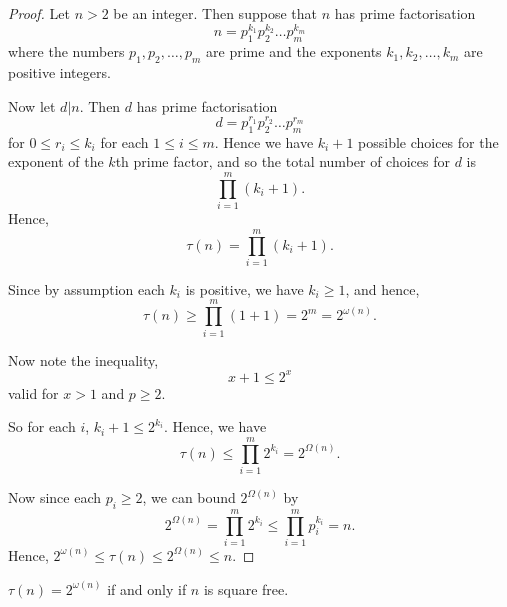 \documentclass{unswmaths}
\begin{document}
\begin{proof}
    Let $n > 2$ be an integer. Then suppose that $n$ has prime factorisation
    \begin{equation*}
        n = p_1^{k_1}p_2^{k_2}\ldots p_m^{k_m}
    \end{equation*}
    where the numbers $p_1,p_2,\ldots,p_m$ are prime and the exponents $k_1,k_2,\ldots,k_m$
    are positive integers.
    
    Now let $d|n$. Then $d$ has prime factorisation
    \begin{equation*}
        d = p_1^{r_1}p_2^{r_2}\ldots p_m^{r_m}
    \end{equation*}
    for $0\leq r_i \leq k_i$ for each $1\leq i \leq m$. Hence we have $k_i+1$
    possible choices for the exponent of the $k$th prime factor, and so the total
    number of choices for $d$ is
    \begin{equation*}
        \prod_{i=1}^m (k_i+1).
    \end{equation*}
    Hence,
    \begin{equation*}
        \tau(n) = \prod_{i=1}^m (k_i+1).
    \end{equation*}
    
    Since by assumption each $k_i$ is positive, we have $k_i \geq 1$, and hence,
    \begin{equation*}
        \tau(n) \geq \prod_{i=1}^m (1+1) = 2^m = 2^{\omega(n)}.
    \end{equation*}
    
    Now note the inequality,
    \begin{equation*}
        x+1\leq 2^x
    \end{equation*}
    valid for $x > 1$ and $p \geq 2$.
    
    So for each $i$, $k_i+1\leq 2^{k_i}$.
    Hence, we have
    \begin{equation*}
        \tau(n) \leq \prod_{i=1}^m 2^{k_i} = 2^{\Omega(n)}.
    \end{equation*}
    
    Now since each $p_i\geq 2$, we can bound $2^{\Omega(n)}$
    by
    \begin{equation*}
        2^{\Omega(n)} = \prod_{i=1}^m 2^{k_i} \leq \prod_{i=1}^m p_i^{k_i} = n.
    \end{equation*}
    Hence, $2^{\omega(n)}\leq \tau(n) \leq 2^{\Omega(n)} \leq n$.
\end{proof}
\begin{unswlem}
    $\tau(n) = 2^{\omega(n)}$ if and only if $n$ is square free.
\end{unswlem}
\end{document}
